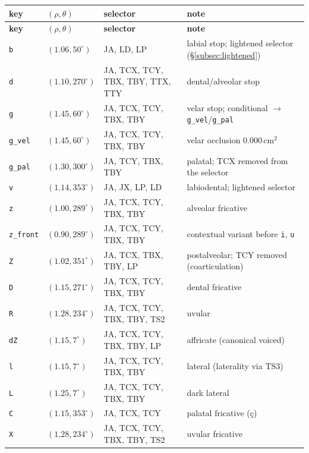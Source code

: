 \documentclass[11pt,a4paper]{article}
\begin{document}
\begin{longtable}{@{}llp{4.6cm}p{5.6cm}@{}}
\toprule
\textbf{key} & \((\rho,\theta)\) & \textbf{selector} & \textbf{note} \\
\midrule
\endfirsthead
\toprule
\textbf{key} & \((\rho,\theta)\) & \textbf{selector} & \textbf{note} \\
\midrule
\endhead
\bottomrule
\endfoot
\texttt{b}    & \((1.06, 50^\circ)\)   & JA, LD, LP & labial stop; lightened selector (\S\ref{subsec:lightened}) \\
\texttt{d}    & \((1.10, 270^\circ)\)  & JA, TCX, TCY, TBX, TBY, TTX, TTY & dental/alveolar stop \\
\texttt{g}    & \((1.45, 60^\circ)\)   & JA, TCX, TCY, TBX, TBY & velar stop; conditional \(\to\) \texttt{g\_vel}/\texttt{g\_pal} \\
\texttt{g\_vel} & \((1.45, 60^\circ)\) & JA, TCX, TCY, TBX, TBY & velar occlusion \(0.000\,\mathrm{cm^2}\) \\
\texttt{g\_pal} & \((1.30, 300^\circ)\)& JA, TCY, TBX, TBY & palatal; TCX removed from the selector \\
\texttt{v}    & \((1.14, 353^\circ)\)  & JA, JX, LP, LD & labiodental; lightened selector \\
\texttt{z}    & \((1.00, 289^\circ)\)  & JA, TCX, TCY, TBX, TBY & alveolar fricative \\
\texttt{z\_front} & \((0.90, 289^\circ)\) & JA, TCX, TCY, TBX, TBY & contextual variant before \texttt{i}, \texttt{u} \\
\texttt{Z}    & \((1.02, 351^\circ)\)  & JA, TCX, TBX, TBY, LP & postalveolar; TCY removed (coarticulation) \\
\texttt{D}    & \((1.15, 271^\circ)\)  & JA, TCX, TCY, TBX, TBY & dental fricative \\
\texttt{R}    & \((1.28, 234^\circ)\)  & JA, TCX, TCY, TBX, TBY, TS2 & uvular \\
\texttt{dZ}   & \((1.15, 7^\circ)\)    & JA, TCX, TCY, TBX, TBY, LP & affricate (canonical voiced) \\
\texttt{l}    & \((1.15, 7^\circ)\)    & JA, TCX, TCY, TBX, TBY & lateral (laterality via TS3) \\
\texttt{L}    & \((1.25, 7^\circ)\)    & JA, TCX, TCY, TBX, TBY & dark lateral \\
\texttt{C}    & \((1.15, 353^\circ)\)  & JA, TCX, TCY & palatal fricative (\c{c}) \\
\texttt{X}    & \((1.28, 234^\circ)\)  & JA, TCX, TCY, TBX, TBY, TS2 & uvular fricative \\

\end{longtable}
\end{document}
